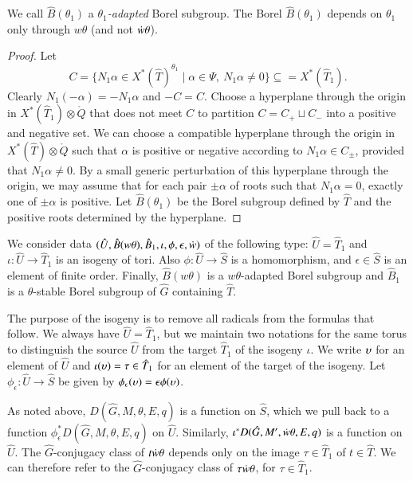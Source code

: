 We call $\hat B(\theta_1)$ a {\it $\theta_1$-adapted} Borel subgroup.
The Borel $\hat B(\theta_1)$ depends on $\theta_1$ only through
$w\theta$ (and not $\dot w \theta$).

\begin{proof}  Let 
\[
C = \{N_1\alpha\in X^*(\hat T)^{\theta_1} \mid \alpha\in\Psi,\ N_1\alpha\ne 0\}
\subseteq =X^*(\hat T_1).
\]
Clearly $N_1(-\alpha)= - N_1\alpha$ and $-C = C$.  Choose a hyperplane
through the origin in $X^*(\hat T_1)\otimes\ring{Q}$ that does not
meet $C$ to partition $C = C_+ \sqcup C_-$ into a positive and
negative set.  We can choose a compatible hyperplane through the
origin in $X^*(\hat T)\otimes\ring{Q}$ such that $\alpha$ is positive
or negative according to $N_1\alpha\in C_\pm$, provided that
$N_1\alpha\ne 0$.  By a small generic perturbation of this hyperplane
through the origin, we may assume that for each pair $\pm\alpha$ of
roots such that $N_1\alpha=0$, exactly one of $\pm\alpha$ is positive.
Let $\hat B(\theta_1)$ be the Borel subgroup defined by $\hat T$ and
the positive roots determined by the hyperplane.
\end{proof}

We consider data $(\hat U,\hat B(w\theta),\hat
B_1,\iota,\phi,\epsilon,\dot w)$ of the following type: $\hat U = \hat
T_1$ and $\iota:\hat U\to \hat T_1$ is an isogeny of tori.  Also
$\phi:\hat U\to \hat S$ is a homomorphism, and $\epsilon\in \hat S$ is
an element of finite order.  Finally, $\hat B(w\theta)$ is a
$w\theta$-adapted Borel subgroup and $\hat B_1$ is a $\theta$-stable
Borel subgroup of $\hat G$ containing $\hat T$.


The purpose of the isogeny is to remove all radicals from the formulas that follow.
We always have $\hat U = \hat T_1$, but we maintain two notations for
the same torus to distinguish the source $\hat U$ from the target
$\hat T_1$ of the isogeny $\iota$.  We write $\upsilon$ for an element of
$\hat U$ and $\iota(\upsilon)=\tau\in \hat T_1$ for an element of the target of the
isogeny.  Let $\phi_\epsilon:\hat U\to\hat S$ be given by $\phi_\epsilon(\upsilon)=
\epsilon\phi(\upsilon)$.

As noted above,
$D(\hat G,M,\theta,E,q)$ is a function on $\hat S$, which we pull back
to a function $\phi^*_\epsilon D(\hat G,M,\theta,E,q)$ on $\hat U$.
Similarly, $\iota^* D(\hat G,M',\dot w \theta,E,q)$ is a function on
$\hat U$.  The $\hat G$-conjugacy class of $t\dot w \theta$ depends
only on the image $\tau\in \hat T_1$ of $t\in \hat T$.  We can
therefore refer to the $\hat G$-conjugacy class of $\tau\dot w\theta$,
for $\tau\in \hat T_1$.

